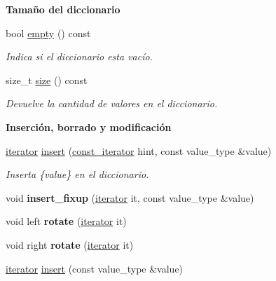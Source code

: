 \begin{Indent}{\bf \-Tamaño del diccionario}\par
\begin{DoxyCompactItemize}
\item 
bool \hyperlink{classaed2_1_1iterator_a2ce99485deecad0038a82bb98167c3a9}{empty} () const 
\begin{DoxyCompactList}\small\item\em \-Indica si el diccionario esta vacío. \end{DoxyCompactList}\item 
size\-\_\-t \hyperlink{classaed2_1_1iterator_a75fda8b0f9b937433d0872573dc6c27f}{size} () const 
\begin{DoxyCompactList}\small\item\em \-Devuelve la cantidad de valores en el diccionario. \end{DoxyCompactList}\end{DoxyCompactItemize}
\end{Indent}
\begin{Indent}{\bf \-Inserción, borrado y modificación}\par
\begin{DoxyCompactItemize}
\item 
\hyperlink{classaed2_1_1iterator_1_1iterator}{iterator} \hyperlink{classaed2_1_1iterator_ab9446668ad5619115b6c4a10eac83d68}{insert} (\hyperlink{classaed2_1_1iterator_1_1const__iterator}{const\-\_\-iterator} hint, const value\-\_\-type \&value)
\begin{DoxyCompactList}\small\item\em \-Inserta \{value\} en el diccionario. \end{DoxyCompactList}\item 
\hypertarget{classaed2_1_1iterator_ab23378eb6149357e1a2167e9804eb6e3}{void {\bfseries insert\-\_\-fixup} (\hyperlink{classaed2_1_1iterator_1_1iterator}{iterator} it, const value\-\_\-type \&value)}\label{classaed2_1_1iterator_ab23378eb6149357e1a2167e9804eb6e3}

\item 
\hypertarget{classaed2_1_1iterator_af4e447a081108196ecdf39b16ecb5303}{void left {\bfseries rotate} (\hyperlink{classaed2_1_1iterator_1_1iterator}{iterator} it)}\label{classaed2_1_1iterator_af4e447a081108196ecdf39b16ecb5303}

\item 
\hypertarget{classaed2_1_1iterator_a191eae4f3f076914ff1560a2fa833b70}{void right {\bfseries rotate} (\hyperlink{classaed2_1_1iterator_1_1iterator}{iterator} it)}\label{classaed2_1_1iterator_a191eae4f3f076914ff1560a2fa833b70}

\item 
\hyperlink{classaed2_1_1iterator_1_1iterator}{iterator} \hyperlink{classaed2_1_1iterator_aa1870e8bfa4f45c82fa1ee076846922b}{insert} (const value\-\_\-type \&value)
\end{DoxyCompactItemize}
\end{Indent}
